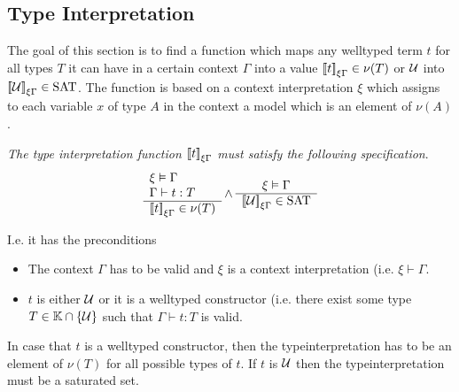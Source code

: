 \subsection{Type Interpretation}

The goal of this section is to find a function which maps any welltyped term $t$
for all types $T$ it can have in a certain context $\Gamma$ into a value
${{[\![} t{]\!]}}_{\xi\Gamma} \in \nu (T)$ or ${\cal U}$ into
${{[\![} {\cal U}{]\!]}}_{\xi\Gamma} \in \text{SAT}$. The function is based on a context
interpretation $\xi$ which assigns to each variable $x$ of type $A$ in the
context a model which is an element of $\nu(A)$.

\begin{definition}
    \label{SpecificationTypeInterpretation}
    \emph{The type interpretation function ${{[\![} t{]\!]}}_{\xi\Gamma}$ must
    satisfy the following specification}.
    $$
    \begin{array}{l} 
        \xi \vDash \Gamma
        \\
        \Gamma \vdash t : T
     \\ \hline 
        {{[\![}t{]\!]}}_{\xi\Gamma} \in \nu(T)
    \end{array}
    \land
    \begin{array}{c} 
        \xi \vDash \Gamma
     \\ \hline 
        {{[\![}{\cal U}{]\!]}}_{\xi\Gamma} \in \text{SAT}
    \end{array}
    $$

    I.e. it has the preconditions
    \begin{itemize}
    \item The context $\Gamma$ has to be valid and $\xi$ is a context
        interpretation (i.e. $\xi \vdash \Gamma$.

    \item $t$ is either ${\cal U}$ or it is a welltyped constructor (i.e. there
        exist some type $T \in \mathbb{K} \cap {\{{\cal U}\}}$ such that $\Gamma \vdash
            t : T$ is
    valid.
    \end{itemize}

    In case that $t$ is a welltyped constructor, then the typeinterpretation has
    to be an element of $\nu(T)$ for all possible types of $t$. If $t$ is ${\cal U}$
    then the typeinterpretation must be a saturated set.
\end{definition}


